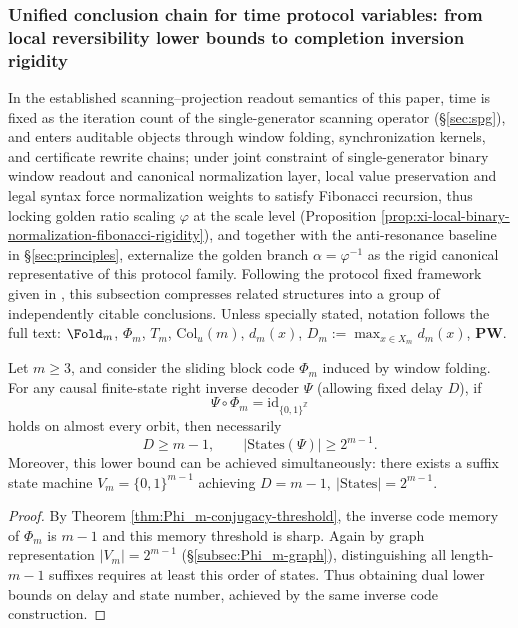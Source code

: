 \subsubsection{Unified conclusion chain for time protocol variables: from local reversibility lower bounds to completion inversion rigidity}\label{subsubsec:xi-time-protocol-conclusions}
In the established scanning--projection readout semantics of this paper, time is fixed as the iteration count of the single-generator scanning operator (\S\ref{sec:spg}), and enters auditable objects through window folding, synchronization kernels, and certificate rewrite chains; under joint constraint of single-generator binary window readout and canonical normalization layer, local value preservation and legal syntax force normalization weights to satisfy Fibonacci recursion, thus locking golden ratio scaling \(\varphi\) at the scale level (Proposition \ref{prop:xi-local-binary-normalization-fibonacci-rigidity}), and together with the anti-resonance baseline in \S\ref{sec:principles}, externalize the golden branch \(\alpha=\varphi^{-1}\) as the rigid canonical representative of this protocol family.
Following the protocol fixed framework given in \cite{Internal2026POMGenerativeAddressThreeRegisterBridgeRH}, this subsection compresses related structures into a group of independently citable conclusions.
Unless specially stated, notation follows the full text: \(\Fold_m\), \(\Phi_m\), \(T_m\), \(\mathrm{Col}_u(m)\), \(d_m(x)\), \(D_m:=\max_{x\in X_m}d_m(x)\), \(\mathbf{PW}\).

\begin{theorem}\label{thm:xi-time-min-delay-min-states}
Let \(m\ge 3\), and consider the sliding block code \(\Phi_m\) induced by window folding.
For any causal finite-state right inverse decoder \(\Psi\) (allowing fixed delay \(D\)), if
\[
\Psi\circ\Phi_m=\mathrm{id}_{\{0,1\}^{\mathbb Z}}
\]
holds on almost every orbit, then necessarily
\[
D\ge m-1,
\qquad
|\mathrm{States}(\Psi)|\ge 2^{m-1}.
\]
Moreover, this lower bound can be achieved simultaneously: there exists a suffix state machine \(V_m=\{0,1\}^{m-1}\) achieving
\(
D=m-1,\ |\mathrm{States}|=2^{m-1}
\).
\end{theorem}

\begin{proof}
By Theorem \ref{thm:Phi_m-conjugacy-threshold}, the inverse code memory of \(\Phi_m\) is \(m-1\) and this memory threshold is sharp.
Again by graph representation \(|V_m|=2^{m-1}\) (\S\ref{subsec:Phi_m-graph}), distinguishing all length-\(m-1\) suffixes requires at least this order of states.
Thus obtaining dual lower bounds on delay and state number, achieved by the same inverse code construction.
\end{proof}

